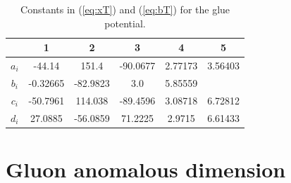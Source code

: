 \documentclass[%
reprint,
superscriptaddress,
showpacs,preprintnumbers,
 amsmath,amssymb,
 aps,
prd,
]{revtex4-1}
\def\eq#1{(\ref{#1})}
\begin{document}
%
\begin{table}[tb!]
  \centering
  \begin{tabular}{c||c|c|c|c|c}
     & 1 & 2 & 3 & 4 & 5 \rule{0pt}{2.6ex}\rule[-1.2ex]{0pt}{0pt}\\ \hline\hline
    $a_i$ &-44.14& 151.4 & -90.0677 &2.77173 &3.56403 \\\hline
    $b_i$ &-0.32665 &-82.9823 &3.0 &5.85559  &\\\hline
    $c_i$ &-50.7961 &114.038 &-89.4596 &3.08718 &6.72812\\\hline
    $d_i$ & 27.0885 &-56.0859 &71.2225 &2.9715 &6.61433\\
  \end{tabular}
  \caption{Constants in \eq{eq:xT} and \eq{eq:bT} for the glue
    potential.}
  \label{tab:coeffs}
\end{table}
%

\section{Gluon anomalous dimension}
\label{app:gluon}
\end{document}
